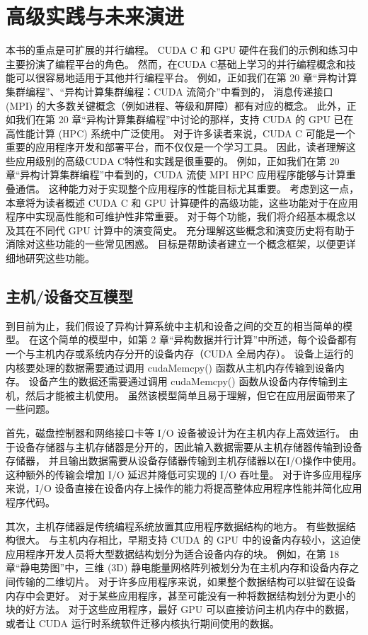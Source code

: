 \section{高级实践与未来演进}
本书的重点是可扩展的并行编程。 CUDA C 和 GPU 硬件在我们的示例和练习中主要扮演了编程平台的角色。 
然而，在CUDA C基础上学习的并行编程概念和技能可以很容易地适用于其他并行编程平台。 
例如，正如我们在第 20 章“异构计算集群编程”、“异构计算集群编程：CUDA 流简介”中看到的，
消息传递接口 (MPI) 的大多数关键概念（例如进程、等级和屏障）都有对应的概念。
此外，正如我们在第 20 章“异构计算集群编程”中讨论的那样，支持 CUDA 的 GPU 已在高性能计算 (HPC) 系统中广泛使用。 
对于许多读者来说，CUDA C 可能是一个重要的应用程序开发和部署平台，而不仅仅是一个学习工具。 
因此，读者理解这些应用级别的高级CUDA C特性和实践是很重要的。 
例如，正如我们在第 20 章“异构计算集群编程”中看到的，CUDA 流使 MPI HPC 应用程序能够与计算重叠通信。 
这种能力对于实现整个应用程序的性能目标尤其重要。 
考虑到这一点，本章将为读者概述 CUDA C 和 GPU 计算硬件的高级功能，这些功能对于在应用程序中实现高性能和可维护性非常重要。 
对于每个功能，我们将介绍基本概念以及其在不同代 GPU 计算中的演变简史。 
充分理解这些概念和演变历史将有助于消除对这些功能的一些常见困惑。 目标是帮助读者建立一个概念框架，以便更详细地研究这些功能。

\subsection{主机/设备交互模型}
到目前为止，我们假设了异构计算系统中主机和设备之间的交互的相当简单的模型。 
在这个简单的模型中，如第 2 章“异构数据并行计算”中所述，每个设备都有一个与主机内存或系统内存分开的设备内存（CUDA 全局内存）。 
设备上运行的内核要处理的数据需要通过调用 cudaMemcpy() 函数从主机内存传输到设备内存。 
设备产生的数据还需要通过调用 cudaMemcpy() 函数从设备内存传输到主机，然后才能被主机使用。 
虽然该模型简单且易于理解，但它在应用层面带来了一些问题。

首先，磁盘控制器和网络接口卡等 I/O 设备被设计为在主机内存上高效运行。 
由于设备存储器与主机存储器是分开的，因此输入数据需要从主机存储器传输到设备存储器，
并且输出数据需要从设备存储器传输到主机存储器以在I/O操作中使用。 这种额外的传输会增加 I/O 延迟并降低可实现的 I/O 吞吐量。 
对于许多应用程序来说，I/O 设备直接在设备内存上操作的能力将提高整体应用程序性能并简化应用程序代码。

其次，主机存储器是传统编程系统放置其应用程序数据结构的地方。 有些数据结构很大。 
与主机内存相比，早期支持 CUDA 的 GPU 中的设备内存较小，这迫使应用程序开发人员将大型数据结构划分为适合设备内存的块。 
例如，在第 18 章“静电势图”中，三维 (3D) 静电能量网格阵列被划分为在主机内存和设备内存之间传输的二维切片。 
对于许多应用程序来说，如果整个数据结构可以驻留在设备内存中会更好。 
对于某些应用程序，甚至可能没有一种将数据结构划分为更小的块的好方法。 
对于这些应用程序，最好 GPU 可以直接访问主机内存中的数据，或者让 CUDA 运行时系统软件迁移内核执行期间使用的数据。

